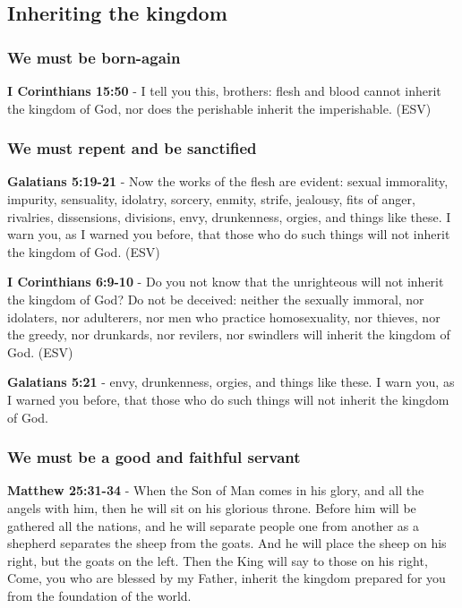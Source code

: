 \documentclass[11pt]{article}
\begin{document}
\subsection{Inheriting the kingdom}
\label{sec:org48a38b7}
\subsubsection{We must be born-again}
\label{sec:org8cc7d81}
\textbf{I Corinthians 15:50} - I tell you this, brothers: flesh and blood cannot inherit the kingdom of God, nor does the perishable inherit the imperishable. (ESV)

\subsubsection{We must repent and be sanctified}
\label{sec:org19866f3}
\textbf{Galatians 5:19-21} -  Now the works of the flesh are evident: sexual immorality, impurity, sensuality, idolatry, sorcery, enmity, strife, jealousy, fits of anger, rivalries, dissensions, divisions, envy, drunkenness, orgies, and things like these.  I warn you, as I warned you before, that those who do such things will not inherit the kingdom of God. (ESV)

\textbf{I Corinthians 6:9-10} - Do you not know that the unrighteous will not inherit the kingdom of God? Do not be deceived: neither the sexually immoral, nor idolaters, nor adulterers, nor men who practice homosexuality, nor thieves, nor the greedy, nor drunkards, nor revilers, nor swindlers will inherit the kingdom of God. (ESV)

\textbf{Galatians 5:21} - envy, drunkenness, orgies, and things like these. I warn you, as I warned you before, that those who do such things will not inherit the kingdom of God.

\subsubsection{We must be a good and faithful servant}
\label{sec:org1495cab}
\textbf{Matthew 25:31-34} - When the Son of Man comes in his glory, and all the angels with him, then he will sit on his glorious throne. Before him will be gathered all the nations, and he will separate people one from another as a shepherd separates the sheep from the goats. And he will place the sheep on his right, but the goats on the left. Then the King will say to those on his right, Come, you who are blessed by my Father, inherit the kingdom prepared for you from the foundation of the world.
\end{document}
